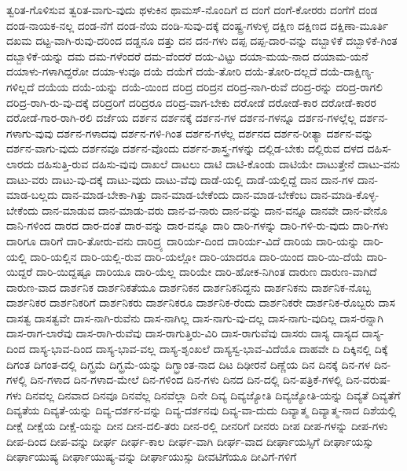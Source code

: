 {ತ್ವರಿತ-ಗೊಳಿಸುವ
ತ್ವರಿತ-ವಾಗು-ವುದು
ಥಳುಕಿನ
ಥಾಮಸ್-ನೊಂದಿಗೆ
ದ
ದಂಗೆ
ದಂಗೆ-ಕೋರರು
ದಂಗೆಗೆ
ದಂಡ
ದಂಡ-ನಾಯಕ-ನಲ್ಲ
ದಂಡ-ನೆಗೆ
ದಂಡ-ನೆಯ
ದಂಡಿ-ಸುವು-ದಕ್ಕೆ
ದಂಷ್ಟ್ರ-ಗಳುಳ್ಳ
ದಕ್ಷಿಣ
ದಕ್ಷಿಣದ
ದಕ್ಷಿಣಾ-ಮೂರ್ತಿ
ದಖಮ
ದಟ್ಟ-ವಾಗಿ-ರುವು-ದರಿಂದ
ದಡ್ಡನೂ
ದತ್ತು
ದನ
ದನ-ಗಳು
ದಪ್ಪ
ದಪ್ಪ-ದಾರ-ವನ್ನು
ದಬ್ಬಾಳಿಕೆ
ದಬ್ಬಾಳಿಕೆ-ಗಿಂತ
ದಬ್ಬಾಳಿಕೆ-ಯನ್ನು
ದಮ
ದಮ-ಗಳೆಂದರೆ
ದಮ-ವೆಂದರೆ
ದಯ-ವಿಟ್ಟು
ದಯಾ-ಮಯ-ನಾದ
ದಯಾಮ-ಯನೆ
ದಯಾಳು-ಗಳಾಗಿದ್ದರೋ
ದಯಾ-ಳುವೂ
ದಯೆ
ದಯೆಗೆ
ದಯೆ-ತೋರಿ
ದಯೆ-ತೋರಿ-ದಲ್ಲದೆ
ದಯೆ-ದಾಕ್ಷಿಣ್ಯ-ಗಳಿಲ್ಲದೆ
ದಯೆಯ
ದಯೆ-ಯನ್ನು
ದಯೆ-ಯಿಂದ
ದರಿದ್ರ
ದರಿದ್ರನ
ದರಿದ್ರ-ನಾಗಿ-ರುವೆ
ದರಿದ್ರ-ರನ್ನು
ದರಿದ್ರ-ರಾಗಲಿ
ದರಿದ್ರ-ರಾಗಿ-ರು-ವು-ದಕ್ಕೆ
ದರಿದ್ರರಿಗೆ
ದರಿದ್ರರೂ
ದರಿದ್ರ-ವಾಗ-ಬೇಕು
ದರೋಡೆ
ದರೋಡೆ-ಕಾರ
ದರೋಡೆ-ಕಾರರ
ದರೋಡೆ-ಗಾರ-ರಾಗಿ-ರಲಿ
ದರ್ಜೆಯ
ದರ್ಶನ
ದರ್ಶನಕ್ಕೆ
ದರ್ಶನ-ಗಳ
ದರ್ಶನ-ಗಳನ್ನೂ
ದರ್ಶನ-ಗಳಲ್ಲೆಲ್ಲ
ದರ್ಶನ-ಗಳಾಗು-ವುವು
ದರ್ಶನ-ಗಳಾದವು
ದರ್ಶನ-ಗಳಿ-ಗಿಂತ
ದರ್ಶನ-ಗಳೆಲ್ಲ
ದರ್ಶನದ
ದರ್ಶನ-ರೀತ್ಯಾ
ದರ್ಶನ-ವನ್ನು
ದರ್ಶನ-ವಾಗು-ವುದು
ದರ್ಶನವೂ
ದರ್ಶನ-ವೊಂದು
ದರ್ಶನ-ಶಾಸ್ತ್ರ-ಗಳನ್ನು
ದಲ್ಲಿಡ-ಬೇಕು
ದಲ್ಲಿರುವ
ದಳದ
ದಹಿಸ-ಲಾರದು
ದಹಿಸುತ್ತಿ-ರುವ
ದಹಿಸು-ವುವು
ದಾಖಲೆ
ದಾಟಲು
ದಾಟಿ
ದಾಟಿ-ಕೊಂಡು
ದಾಟಿಯೇ
ದಾಟುತ್ತೇನೆ
ದಾಟು-ವನು
ದಾಟು-ವರು
ದಾಟು-ವು-ದಕ್ಕೆ
ದಾಟು-ವುದು
ದಾಟು-ವೆವು
ದಾಡೆ-ಯಲ್ಲಿ
ದಾಡೆ-ಯಲ್ಲಿದ್ದೆ
ದಾನ
ದಾನ-ಗಳ
ದಾನ-ಮಾಡ-ಬಲ್ಲದು
ದಾನ-ಮಾಡ-ಬೇಕಾ-ಗಿತ್ತು
ದಾನ-ಮಾಡ-ಬೇಕೆಂದು
ದಾನ-ಮಾಡ-ಬೇಕೆಂಬ
ದಾನ-ಮಾಡಿ-ಕೊಳ್ಳ-ಬೇಕೆಂದು
ದಾನ-ಮಾಡುವ
ದಾನ-ಮಾಡು-ವರು
ದಾನ-ವ-ನಾರು
ದಾನ-ವನ್ನು
ದಾನ-ವನ್ನೂ
ದಾನವೇ
ದಾನ-ವೇನೊ
ದಾನಿ-ಗಳಿಂದ
ದಾರದ
ದಾರ-ದಂತೆ
ದಾರ-ವನ್ನು
ದಾರ-ವನ್ನೂ
ದಾರಿ
ದಾರಿ-ಗಳನ್ನು
ದಾರಿ-ಗಳಿ-ರು-ವುದು
ದಾರಿ-ಗಳು
ದಾರಿಗೂ
ದಾರಿಗೆ
ದಾರಿ-ತೋರು-ವನು
ದಾರಿದ್ರ್ಯ
ದಾರಿರ್ಯ-ದಿಂದ
ದಾರಿರ್ಯ-ವಿದೆ
ದಾರಿಯ
ದಾರಿ-ಯನ್ನು
ದಾರಿ-ಯಲ್ಲಿ
ದಾರಿ-ಯಲ್ಲಿನ
ದಾರಿ-ಯಲ್ಲಿ-ರುವ
ದಾರಿ-ಯಲ್ಲೋ
ದಾರಿ-ಯಾದರೂ
ದಾರಿ-ಯಿಂದ
ದಾರಿ-ಯಿ-ದೆಯೆ
ದಾರಿ-ಯಿದ್ದರೆ
ದಾರಿ-ಯಿದ್ದಷ್ಟೂ
ದಾರಿಯೂ
ದಾರಿ-ಯೆಲ್ಲ
ದಾರಿಯೇ
ದಾರಿ-ಹೋಕ-ನಿಗಿಂತ
ದಾರುಣ
ದಾರುಣ-ವಾಗಿದೆ
ದಾರುಣ-ವಾದ
ದಾರ್ಶನಿಕ
ದಾರ್ಶನಿಕತೆಯೂ
ದಾರ್ಶನಿಕನ
ದಾರ್ಶನಿಕನಿದ್ದನು
ದಾರ್ಶನಿಕನು
ದಾರ್ಶನಿಕ-ನೊಬ್ಬ
ದಾರ್ಶನಿಕರ
ದಾರ್ಶನಿಕರಿಗೆ
ದಾರ್ಶನಿಕರು
ದಾರ್ಶನಿಕರೂ
ದಾರ್ಶನಿಕ-ರೆಂದು
ದಾರ್ಶನಿಕರೇ
ದಾರ್ಶನಿಕ-ರೊಬ್ಬರು
ದಾಸ
ದಾಸತ್ವ
ದಾಸತ್ವವೇ
ದಾಸ-ನಾಗಿ-ರುವೆನು
ದಾಸ-ನಾಗಿಲ್ಲ
ದಾಸ-ನಾಗು-ವು-ದಲ್ಲ
ದಾಸ-ನಾಗು-ವುದಿಲ್ಲ
ದಾಸ-ರನ್ನಾಗಿ
ದಾಸ-ರಾಗ-ಲಾರೆವು
ದಾಸ-ರಾಗಿ-ರುವೆವು
ದಾಸ-ರಾಗುತ್ತಿರು-ವಿರಿ
ದಾಸ-ರಾಗುವೆವು
ದಾಸರು
ದಾಸ್ಯ
ದಾಸ್ಯದ
ದಾಸ್ಯ-ದಿಂದ
ದಾಸ್ಯ-ಭಾವ-ದಿಂದ
ದಾಸ್ಯ-ಭಾವ-ವಲ್ಲ
ದಾಸ್ಯ-ಶೃಂಖಲೆ
ದಾಸ್ಯಸ್ವ-ಭಾವ-ವಿದೆಯೊ
ದಾಹವೇ
ದಿ
ದಿಕ್ಕಿನಲ್ಲಿ
ದಿಕ್ಕೆ
ದಿಗಂತ
ದಿಗಂತ-ದಲ್ಲಿ
ದಿಗ್ಭ್ರಮೆ
ದಿಗ್ಭ್ರಮೆ-ಯನ್ನು
ದಿಗ್ಭ್ರಾಂತ-ನಾದ
ದಿಟ
ದಿಢೀರನೆ
ದಿಣ್ಣೆಯ
ದಿನ
ದಿನಕ್ಕೆ
ದಿನ-ಗಳ
ದಿನ-ಗಳಲ್ಲಿ
ದಿನ-ಗಳಾದ
ದಿನ-ಗಳಾದ-ಮೇಲೆ
ದಿನ-ಗಳಿಂದ
ದಿನ-ಗಳು
ದಿನದ
ದಿನ-ದಲ್ಲಿ
ದಿನ-ಪತ್ರಿಕೆ-ಗಳಲ್ಲಿ
ದಿನ-ವರುಷ-ಗಳು
ದಿನವಲ್ಲ
ದಿನವಾದ
ದಿನವೂ
ದಿನವೆಲ್ಲ
ದಿನವೆಲ್ಲಾ
ದಿನೇ
ದಿವ್ಯ
ದಿವ್ಯಜ್ಯೋತಿ
ದಿವ್ಯಜ್ಯೋತಿ-ಯನ್ನು
ದಿವ್ಯತೆ
ದಿವ್ಯತೆಗೆ
ದಿವ್ಯತೆಯ
ದಿವ್ಯತೆ-ಯನ್ನು
ದಿವ್ಯ-ದರ್ಶನ-ವನ್ನು
ದಿವ್ಯ-ದರ್ಶನವು
ದಿವ್ಯ-ವಾ-ದುದು
ದಿವ್ಯಾತ್ಮ
ದಿವ್ಯಾತ್ಮ-ನಾದ
ದಿಶೆಯಲ್ಲಿ
ದೀಕ್ಷೆ
ದೀಕ್ಷೆಯ
ದೀಕ್ಷೆ-ಯನ್ನು
ದೀನ
ದೀನ-ದಲಿ-ತರು
ದೀನ-ರಲ್ಲಿ
ದೀನರಿಗೆ
ದೀನರು
ದೀಪ
ದೀಪ-ಗಳನ್ನು
ದೀಪ-ಗಳು
ದೀಪ-ದಿಂದ
ದೀಪ-ವನ್ನು
ದೀರ್ಘ
ದೀರ್ಘ-ಕಾಲ
ದೀರ್ಘ-ವಾಗಿ
ದೀರ್ಘ-ವಾದ
ದೀರ್ಘಾಯಸ್ಸಿಗೆ
ದೀರ್ಘಾಯಸ್ಸು
ದೀರ್ಘಾಯುಷ್ಯ
ದೀರ್ಘಾಯುಷ್ಯ-ವನ್ನು
ದೀರ್ಘಾಯುಸ್ಸು
ದೀವಟಿಗೆಯೂ
ದೀವಿಗೆ-ಗಳಿಗೆ
}
